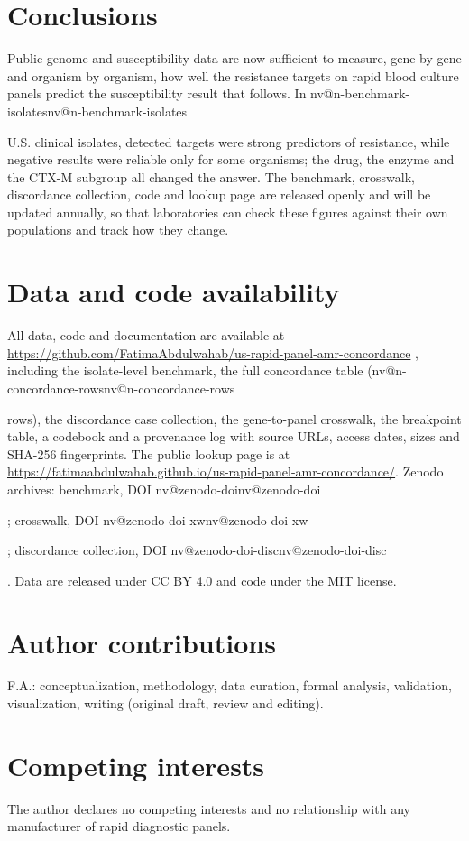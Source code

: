 \documentclass[10pt,twocolumn,letterpaper]{article}
\makeatletter
\newcommand{\nv}[1]{\ifcsname nv@#1\endcsname\csname nv@#1\endcsname\else
  \PackageError{numbers}{Unknown number key: #1}{Run build_assets.py}\fi}
\makeatother
\begin{document}
\section{Conclusions}\label{sec:conclusions}

Public genome and susceptibility data are now sufficient to measure, gene by gene and organism by organism, how well the
resistance targets on rapid blood culture panels predict the susceptibility result that follows. In \nv{n-benchmark-isolates}
U.S. clinical isolates, detected targets were strong predictors of resistance, while negative results were reliable only
for some organisms; the drug, the enzyme and the CTX-M subgroup all changed the answer. The benchmark, crosswalk,
discordance collection, code and lookup page are released openly and will be updated annually, so that laboratories can
check these figures against their own populations and track how they change.

\section*{Data and code availability}
All data, code and documentation are available at
\url{https://github.com/FatimaAbdulwahab/us-rapid-panel-amr-concordance} \cite{thiswork}, including the isolate-level
benchmark, the full concordance table (\nv{n-concordance-rows} rows), the discordance case collection, the gene-to-panel
crosswalk, the breakpoint table, a codebook and a provenance log with source URLs, access dates, sizes and SHA-256
fingerprints. The public lookup page is at \url{https://fatimaabdulwahab.github.io/us-rapid-panel-amr-concordance/}.
Zenodo archives: benchmark, DOI \nv{zenodo-doi}; crosswalk, DOI \nv{zenodo-doi-xw}; discordance collection, DOI
\nv{zenodo-doi-disc}. Data are released under CC BY 4.0 and code under the MIT license.

\section*{Author contributions}
F.A.: conceptualization, methodology, data curation, formal analysis, validation, visualization, writing (original draft,
review and editing).

\section*{Competing interests}
The author declares no competing interests and no relationship with any manufacturer of rapid diagnostic panels.
\end{document}
